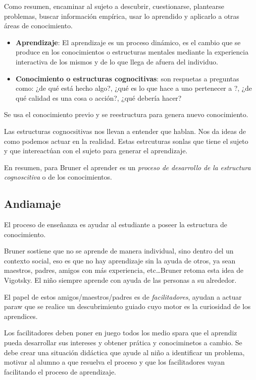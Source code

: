 \documentclass[12pt]{report}
\theoremstyle{largebreak}
\begin{document}
    Como resumen, encaminar al sujeto a descubrir, cuestionarse, plantearse problemas, buscar información empírica, usar lo aprendido y aplicarlo a otras áreas de conocimiento.

    \begin{itemize}
        \item \textbf{Aprendizaje}: El aprendizaje es un proceso dinámico, es el cambio que se produce en los conocimientos o estructuras mentales mediante la experiencia interactiva de los mismos y de lo que llega de afuera del individuo.
        \item \textbf{Conocimiento o estructuras cognocitivas}: son respuetas a preguntas como: ¿de qué está hecho algo?, ¿qué es lo que hace a uno pertenecer a ?, ¿de qué calidad es una cosa o acción?, ¿qué debería hacer?
    \end{itemize}

    Se usa el conocimiento previo y se reestructura para genera nuevo conocimiento.

    Las estructuras cognocsitivas nos llevan a entender que hablan. Nos da ideas de como podemos actuar en la realidad. Estas estrcuturas sonlas que tiene el sujeto y que intereactúan con el sujeto para generar el aprendizaje.

    En resumen, para Bruner el aprender es un \textit{proceso de desarrollo de la estructura cognoscitiva} o de los conocimientos.

    \subsection{Andiamaje}

    El proceso de enseñanza es ayudar al estudiante a poseer la estructura de conocimiento.

    Bruner sostiene que no se aprende de manera individual, sino dentro del un contexto social, eso es que no hay aprendizaje sin la ayuda de otros, ya sean maestros, padres, amigos con más experiencia, etc\dots Bruner retoma esta idea de Vigotsky. El niño siempre aprende con ayuda de las personas a su alrededor.

    El papel de estos amigos/maestros/padres es de \textit{facilitadores}, ayudan a actuar paraw que se realice un descubrimiento guiado cuyo motor es la curiosidad de los aprendices.

    Los facilitadores deben poner en juego todos los medio spara que el aprendiz pueda desarrollar sus intereses y obtener prática y conociminetos a cambio. Se debe crear una situación didáctica que ayude al niño a identificar un problema, motivar al alumno a que resuelva el proceso y que los facilitadores vayan facilitando el proceso de aprendizaje.
\end{document}
